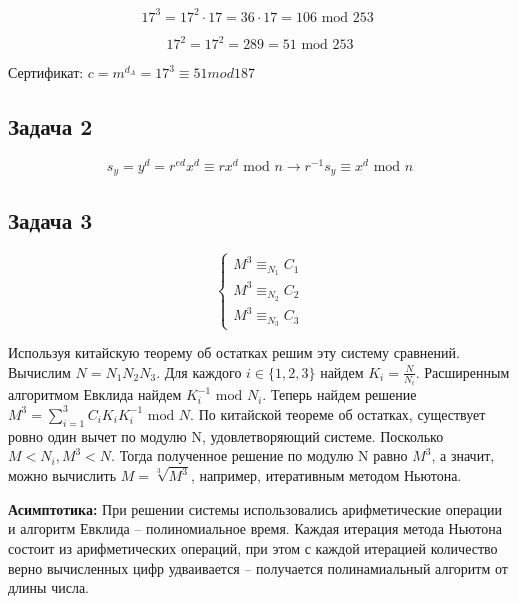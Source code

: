 \documentclass[a4paper,14pt]{article} %
\begin{document}
\begin{equation*}
	17^3 = 17^2 \cdot 17 = 36 \cdot 17 = 106 \text{ mod 253 }
\end{equation*}

\begin{equation*}
	17^2 = 17^2 = 289 = 51 \text{ mod } 253
\end{equation*}

Сертификат: $c = m^{d_A} = 17^3 \equiv 51 mod 187$




\subsection{Задача 2}

\begin{equation*}
	s_y = y^d = r^{ed}x^d \equiv rx^d \text{ mod } n \rightarrow r^{-1}s_y \equiv x^d \text{ mod } n
\end{equation*}

\subsection{Задача 3}
\begin{equation*}
	 \begin{cases}
	   M^3 \equiv_{N_1} C_1\\
	   M^3 \equiv_{N_2} C_2\\
	   M^3 \equiv_{N_3} C_3
	 \end{cases}
\end{equation*}

Используя китайскую теорему об остатках решим эту систему сравнений. Вычислим $N = N_1 N_2 N_3$.
Для каждого $i \in \{1, 2, 3\}$ найдем $K_i = \frac{N}{N_i}$. Расширенным алгоритмом Евклида найдем $K_i^{-1} \text{ mod } N_i$.
Теперь найдем решение $M^3 = \sum\limits_{i = 1}^3 C_iK_iK_i^{-1} \text{ mod } N$. По китайской теореме об остатках, существует ровно один вычет по модулю N,
удовлетворяющий системе. Посколько $M < N_i, M^3 < N$. Тогда полученное решение по модулю N равно $M^3$, а значит, можно вычислить $M = \sqrt[3]{M^3}$, например,
итеративным методом Ньютона.

\textbf{Асимптотика:}
При решении системы использовались арифметические операции и алгоритм Евклида -- полиномиальное время. Каждая итерация метода Ньютона
состоит из арифметических операций, при этом с каждой итерацией количество верно вычисленных цифр удваивается -- получается полинамиальный алгоритм от длины числа.
\end{document}
